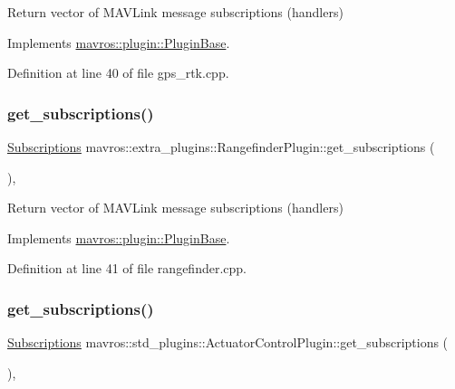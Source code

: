Return vector of M\+A\+V\+Link message subscriptions (handlers) 



Implements \mbox{\hyperlink{group__plugin_gaf4e23fec6d7436a62cbf0942a2e5791c}{mavros\+::plugin\+::\+Plugin\+Base}}.



Definition at line 40 of file gps\+\_\+rtk.\+cpp.

\mbox{\label{group__plugin_ga8911e15033c33875a44b518584464b81}} 
\subsubsection{\texorpdfstring{get\_subscriptions()}{get\_subscriptions()}\hspace{0.1cm}{\footnotesize\ttfamily [3/41]}}
{\footnotesize\ttfamily \mbox{\hyperlink{group__plugin_ga8967d61fc77040e0c3ea5a4585d62a09}{Subscriptions}} mavros\+::extra\+\_\+plugins\+::\+Rangefinder\+Plugin\+::get\+\_\+subscriptions (\begin{DoxyParamCaption}{ }\end{DoxyParamCaption})\hspace{0.3cm}{\ttfamily [inline]}, {\ttfamily [virtual]}}



Return vector of M\+A\+V\+Link message subscriptions (handlers) 



Implements \mbox{\hyperlink{group__plugin_gaf4e23fec6d7436a62cbf0942a2e5791c}{mavros\+::plugin\+::\+Plugin\+Base}}.



Definition at line 41 of file rangefinder.\+cpp.

\mbox{\label{group__plugin_ga9f95e6748d25efba2ab30f5d701cf17c}} 
\subsubsection{\texorpdfstring{get\_subscriptions()}{get\_subscriptions()}\hspace{0.1cm}{\footnotesize\ttfamily [4/41]}}
{\footnotesize\ttfamily \mbox{\hyperlink{group__plugin_ga8967d61fc77040e0c3ea5a4585d62a09}{Subscriptions}} mavros\+::std\+\_\+plugins\+::\+Actuator\+Control\+Plugin\+::get\+\_\+subscriptions (\begin{DoxyParamCaption}{ }\end{DoxyParamCaption})\hspace{0.3cm}{\ttfamily [inline]}, {\ttfamily [virtual]}}



